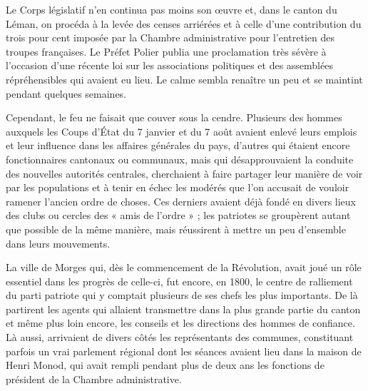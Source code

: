 \documentclass[french,twoside]{book} %
\begin{document}
\noindent Le Corps législatif n’en continua pas moins son œuvre et, dans le canton du Léman, on procéda à la levée des censes arriérées et à celle d’une contribution du trois pour cent imposée par la Chambre administrative pour l’entretien des troupes françaises. Le Préfet Polier publia une proclamation très sévère à l’occasion d’une récente loi sur les associations politiques et des assemblées répréhensibles qui avaient eu lieu. Le calme sembla renaître un peu et se maintint pendant quelques semaines.\par
Cependant, le feu ne faisait que couver sous la cendre. Plusieurs des hommes auxquels les Coups d’État du 7 janvier et du 7 août avaient enlevé leurs emplois et leur influence dans les affaires générales du pays, d’autres qui étaient encore fonctionnaires cantonaux ou communaux, mais qui désapprouvaient la conduite des nouvelles autorités centrales, cherchaient à faire partager leur manière de voir par les populations et à tenir en échec les modérés que l’on accusait de vouloir ramener l’ancien ordre de choses. Ces derniers avaient déjà fondé en divers lieux des clubs ou cercles des « amis de l’ordre » ; les patriotes se groupèrent autant que possible de la même manière, mais réussirent à mettre un peu d’ensemble dans leurs mouvements.\par
La ville de Morges qui, dès le commencement de la Révolution, avait joué un rôle essentiel dans les progrès de celle-ci, fut encore, en 1800, le centre de ralliement du parti patriote qui y comptait plusieurs de ses chefs les plus importants. De là partirent les agents qui allaient transmettre dans la plus grande partie du canton et même plus loin encore, les conseils et les directions des hommes de confiance. Là aussi, arrivaient de divers côtés les représentants des communes, constituant parfois un vrai parlement régional dont les séances avaient lieu dans la maison de Henri Monod, qui avait rempli pendant plus de deux ans les fonctions de président de la Chambre administrative.\par
\end{document}
